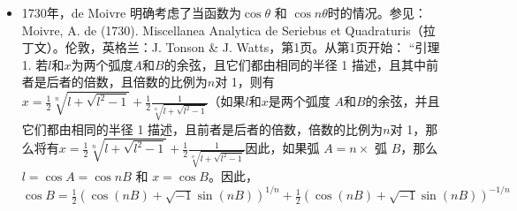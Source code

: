 \begin{enumerate}
\begin{itemize}
\item 1730年，de Moivre 明确考虑了当函数为\( \cos \theta \) 和 \( \cos n\theta \)时的情况。参见：Moivre, A. de (1730). Miscellanea Analytica de Seriebus et Quadraturis（拉丁文）。伦敦，英格兰：J. Tonson & J. Watts，第1页。从第1页开始：  
“引理 1. 若\( l \)和\( x \)为两个弧度\( A \)和\( B \)的余弦，且它们都由相同的半径 1 描述，且其中前者是后者的倍数，且倍数的比例为\( n \)对 1，则有\(x = \frac{1}{2} \sqrt[n]{l + \sqrt{l^2 - 1}} + \frac{1}{2} \frac{1}{\sqrt[n]{l + \sqrt{l^2 - 1}}}\)（如果\( l \)和\( x \)是两个弧度 \( A \)和\( B \)的余弦，并且它们都由相同的半径 1 描述，且前者是后者的倍数，倍数的比例为\( n \)对 1，那么将有\(x = \frac{1}{2} \sqrt[n]{l + \sqrt{l^2 - 1}} + \frac{1}{2} \frac{1}{\sqrt[n]{l + \sqrt{l^2 - 1}}}\)因此，如果弧 \( A = n \times \) 弧 \( B \)，那么 \( l = \cos A = \cos nB \) 和 \( x = \cos B \)。因此，\(\cos B = \frac{1}{2} \left( \cos(nB) + \sqrt{-1} \sin(nB) \right)^{1/n} + \frac{1}{2} \left( \cos(nB) + \sqrt{-1} \sin(nB) \right)^{-1/n}\)
\end{itemize}
\end{enumerate}